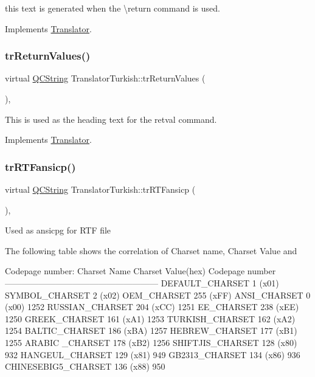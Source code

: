 this text is generated when the \textbackslash{}return command is used. 

Implements \mbox{\hyperlink{class_translator}{Translator}}.

\mbox{\label{class_translator_turkish_a9610317b6fe51e7d11410b20cb014765}} 
\subsubsection{\texorpdfstring{trReturnValues()}{trReturnValues()}}
{\footnotesize\ttfamily virtual \mbox{\hyperlink{class_q_c_string}{Q\+C\+String}} Translator\+Turkish\+::tr\+Return\+Values (\begin{DoxyParamCaption}{ }\end{DoxyParamCaption})\hspace{0.3cm}{\ttfamily [inline]}, {\ttfamily [virtual]}}

This is used as the heading text for the retval command. 

Implements \mbox{\hyperlink{class_translator}{Translator}}.

\mbox{\label{class_translator_turkish_a1280dcd0de6ecb0cc91adc81991770a5}} 
\subsubsection{\texorpdfstring{trRTFansicp()}{trRTFansicp()}}
{\footnotesize\ttfamily virtual \mbox{\hyperlink{class_q_c_string}{Q\+C\+String}} Translator\+Turkish\+::tr\+R\+T\+Fansicp (\begin{DoxyParamCaption}{ }\end{DoxyParamCaption})\hspace{0.3cm}{\ttfamily [inline]}, {\ttfamily [virtual]}}

Used as ansicpg for R\+TF file

The following table shows the correlation of Charset name, Charset Value and 
\begin{DoxyPre}
Codepage number:
Charset Name       Charset Value(hex)  Codepage number
------------------------------------------------------
DEFAULT\_CHARSET           1 (x01)
SYMBOL\_CHARSET            2 (x02)
OEM\_CHARSET             255 (xFF)
ANSI\_CHARSET              0 (x00)            1252
RUSSIAN\_CHARSET         204 (xCC)            1251
EE\_CHARSET              238 (xEE)            1250
GREEK\_CHARSET           161 (xA1)            1253
TURKISH\_CHARSET         162 (xA2)            1254
BALTIC\_CHARSET          186 (xBA)            1257
HEBREW\_CHARSET          177 (xB1)            1255
ARABIC \_CHARSET         178 (xB2)            1256
SHIFTJIS\_CHARSET        128 (x80)             932
HANGEUL\_CHARSET         129 (x81)             949
GB2313\_CHARSET          134 (x86)             936
CHINESEBIG5\_CHARSET     136 (x88)             950
\end{DoxyPre}
 

